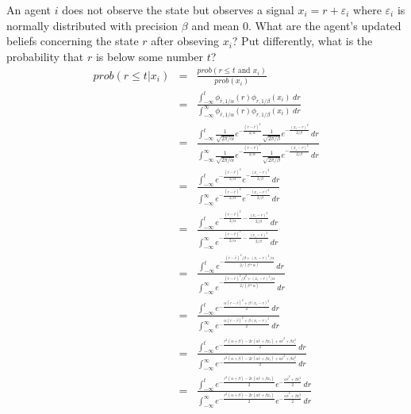 \documentclass[12pt,english,a4paper]{article}
\theoremstyle{plain}
\begin{document}
An agent $i$ does not observe the state but observes a signal $x_i=r+\varepsilon _i$ where $\varepsilon _i$ is normally distributed with precision $\beta$ and mean $0$. What are the agent's updated beliefs concerning the state $r$ after obseving $x_i$? Put differently, what is the probability that $r$ is below some number $t$?
\begin{eqnarray*}
  prob(r\leq t|x_i)&=&\frac{prob(r\leq t \text{ and } x_i)}{prob(x_i)}\\
                   &=&\frac{\int_{-\infty}^t\phi_{\bar r,1/\alpha}(r) \phi_{r,1/\beta}(x_i)\;dr}{\int_{-\infty}^\infty\phi_{\bar r,1/\alpha}(r) \phi_{r,1/\beta}(x_i)\;dr}\\
                   &=&\frac{\int_{-\infty}^t\frac{1}{\sqrt{2\pi/\alpha}}e^{-\frac{(r -\bar{r})^2}{2/\alpha}} \frac{1}{\sqrt{2\pi/\beta}}e^{-\frac{(x_i -r)^2}{2/\beta}}\,dr}{\int_{-\infty}^\infty\frac{1}{\sqrt{2\pi/\alpha}}e^{-\frac{(r -\bar{r})^2}{2/\alpha}} \frac{1}{\sqrt{2\pi/\beta}}e^{-\frac{(x_i -r)^2}{2/\beta}}\,dr}\\
                   &=&\frac{\int_{-\infty}^te^{-\frac{(r -\bar{r})^2}{2/\alpha}} e^{-\frac{(x_i -r)^2}{2/\beta}}\,dr}{\int_{-\infty}^\infty e^{-\frac{(r -\bar{r})^2}{2/\alpha}} e^{-\frac{(x_i -r)^2}{2/\beta}}\,dr}\\
                   &=&\frac{\int_{-\infty}^te^{-\frac{(r -\bar{r})^2}{2/\alpha}-\frac{(x_i -r)^2}{2/\beta}}\,dr}{\int_{-\infty}^\infty e^{-\frac{(r -\bar{r})^2}{2/\alpha}-\frac{(x_i -r)^2}{2/\beta}}\,dr}\\
                   &=&\frac{\int_{-\infty}^te^{-\frac{(r -\bar{r})^2/\beta+(x_i -r)^2/\alpha}{2/(\beta*\alpha)}}\,dr}{\int_{-\infty}^\infty e^{-\frac{(r -\bar{r})^2/\beta^2+(x_i -r)^2/\alpha}{2/(\beta*\alpha)}}\,dr}\\
                   &=&\frac{\int_{-\infty}^te^{-\frac{\alpha(r -\bar{r})^2+\beta(x_i -r)^2}{2}}\,dr}{\int_{-\infty}^\infty e^{-\frac{\alpha(r -\bar{r})^2+\beta(x_i -r)^2}{2}}\,dr}\\
                   &=&\frac{\int_{-\infty}^te^{-\frac{r^2(\alpha+\beta)-2r(\alpha\bar{r}+\beta x_i)+\alpha\bar{r}^2+\beta x_i^2}{2}}\,dr}{\int_{-\infty}^\infty e^{-\frac{r^2(\alpha+\beta)-2r(\alpha\bar{r}+\beta x_i)+\alpha\bar{r}^2+\beta x_i^2}{2}}\,dr}\\
                   &=&\frac{\int_{-\infty}^te^{-\frac{r^2(\alpha+\beta)-2r(\alpha\bar{r}+\beta x_i)}{2}}e^{-\frac{\alpha\bar{r}^2+\beta x_i^2}{2}}\,dr}{\int_{-\infty}^\infty e^{-\frac{r^2(\alpha+\beta)-2r(\alpha\bar{r}+\beta x_i)}{2}}e^{-\frac{\alpha\bar{r}^2+\beta x_i^2}{2}}\,dr}\\

\end{eqnarray*}
\end{document}
